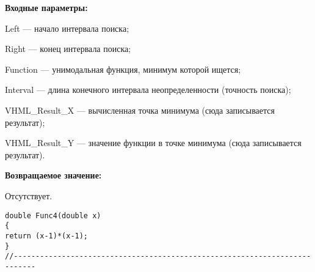 \textbf{Входные параметры:}

 Left --- начало интервала поиска;
 
Right --- конец интервала поиска;
 
Function --- унимодальная функция, минимум которой ищется;
 
Interval --- длина конечного интервала неопределенности (точность поиска);
 
VHML\_Result\_X --- вычисленная точка минимума (сюда записывается результат);
 
VHML\_Result\_Y --- значение функции в точке минимума (сюда записывается результат).

\textbf{Возвращаемое значение:}
 
 Отсутствует.

\begin{lstlisting}[caption=Оптимизируемая функция]
double Func4(double x)
{
return (x-1)*(x-1);
}
//---------------------------------------------------------------------------
\end{lstlisting}